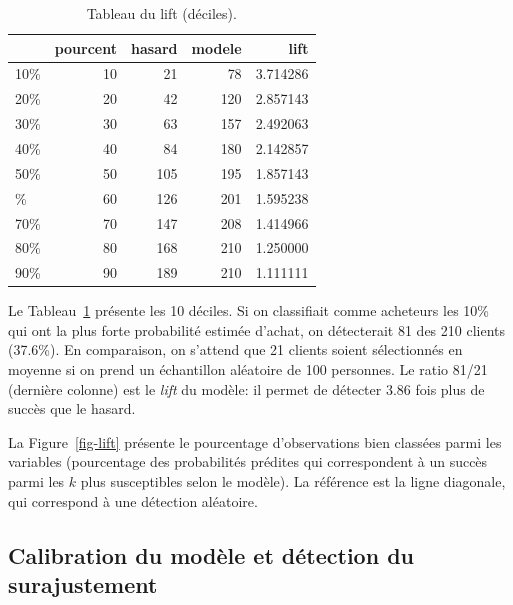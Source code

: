 \documentclass[
  11pt,
  letterpaper,
]{scrbook}
\theoremstyle{definition}
\theoremstyle{remark}
\begin{document}
\hypertarget{tbl-lift}{}
\begin{table}
\caption{\label{tbl-lift}Tableau du lift (déciles). }\tabularnewline

\centering
\begin{tabular}{lrrrr}
\toprule
  & pourcent & hasard & modele & lift\\
\midrule
10\% & 10 & 21 & 78 & 3.714286\\
20\% & 20 & 42 & 120 & 2.857143\\
30\% & 30 & 63 & 157 & 2.492063\\
40\% & 40 & 84 & 180 & 2.142857\\
50\% & 50 & 105 & 195 & 1.857143\\
\addlinespace
60\% & 60 & 126 & 201 & 1.595238\\
70\% & 70 & 147 & 208 & 1.414966\\
80\% & 80 & 168 & 210 & 1.250000\\
90\% & 90 & 189 & 210 & 1.111111\\
\bottomrule
\end{tabular}
\end{table}

Le Tableau~\ref{tbl-lift} présente les 10 déciles. Si on classifiait
comme acheteurs les 10\% qui ont la plus forte probabilité estimée
d'achat, on détecterait 81 des 210 clients (37.6\%). En comparaison, on
s'attend que 21 clients soient sélectionnés en moyenne si on prend un
échantillon aléatoire de 100 personnes. Le ratio 81/21 (dernière
colonne) est le \emph{lift} du modèle: il permet de détecter 3.86 fois
plus de succès que le hasard.

La Figure~\ref{fig-lift} présente le pourcentage d'observations bien
classées parmi les variables (pourcentage des probabilités prédites qui
correspondent à un succès parmi les \(k\) plus susceptibles selon le
modèle). La référence est la ligne diagonale, qui correspond à une
détection aléatoire.

\hypertarget{calibration-du-moduxe8le-et-duxe9tection-du-surajustement}{%
\subsection{Calibration du modèle et détection du
surajustement}\label{calibration-du-moduxe8le-et-duxe9tection-du-surajustement}}
\end{document}
